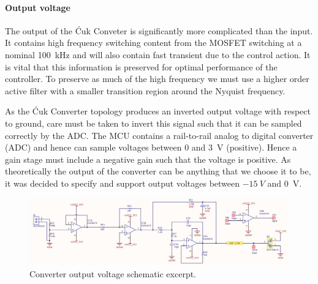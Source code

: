 \paragraph{Output voltage}
The output of the \'Cuk Conveter is significantly more complicated than the input. It contains high frequency switching content from the MOSFET switching at a nominal \SI{100}{kHz} and will also contain fast transient due to the control action. It is vital that this information is preserved for optimal performance of the controller. To preserve as much of the high frequency we must use a higher order active filter with a smaller transition region around the Nyquist frequency.

As the \'Cuk Converter topology produces an inverted output voltage with respect to ground, care must be taken to invert this signal such that it can be sampled correctly by the ADC. The MCU contains a rail-to-rail analog to digital converter (ADC) and hence can sample voltages between 0 and \SI{3}{V} (positive). Hence a gain stage must include a negative gain such that the voltage is positive. As theoretically the output of the converter can be anything that we choose it to be, it was decided to specify and support output voltages between $-\SI{15}{V}$ and \SI{0}{V}.
\begin{figure}[H]
    \centering
    \includegraphics[width = 14cm]{figures/hardware/output_sense.pdf}
    \caption{Converter output voltage schematic excerpt.}
    \label{fig:output_sense}
\end{figure}

